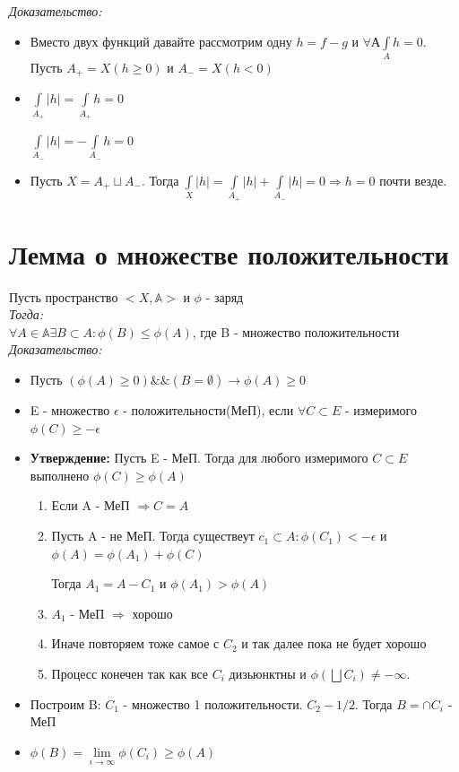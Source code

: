 \documentclass[paper=a4, fontsize=17pt]{article}
\begin{document}
	\emph{Доказательство: }

		\begin{itemize}
			\item
			Вместо двух функций давайте рассмотрим одну $h = f - g$ и $\forall А \int\limits_A h = 0$. Пусть $A_{+} = X(h\geq 0)$ и $A_- = X(h < 0)$
			\item
			$\int\limits_{A_+} |h| = \int\limits_{A_+} h = 0$ \par
			$\int\limits_{A_-} |h| = -\int\limits_{A_-} h = 0$
			\item
			Пусть $X = A_+ \sqcup A_-$. Тогда $\int\limits_X |h| = \int\limits_{A_+} |h| + \int\limits_{A_-} |h| = 0 \Rightarrow h = 0$ почти везде.
		\end{itemize}
\section{Лемма о множестве положительности}
	Пусть пространство $<X, \mathbb{A}>$ и $\phi$ - заряд\\
	\emph{Тогда: }\\
		$\forall A\in \mathbb{A} \exists B \subset A : \phi(B) \leq \phi(A)$, где B - множество положительности \\
	\emph{Доказательство: } \\

		\begin{itemize}
			\item Пусть $(\phi(A) \geq 0) \&\& (B = \emptyset) \rightarrow \phi(A) \geq 0$
			\item E - множество $\epsilon$ - положительности(МеП), если  $\forall C \subset E$ - измеримого $ \phi(C) \geq -\epsilon$
			\item \textbf{Утверждение: }Пусть E - МеП. Тогда для любого измеримого $C \subset E$ выполнено $\phi(C) \geq \phi(A)$
			\begin{enumerate}
				\item Если A - МеП $\Rightarrow C = A$
				\item Пусть A - не МеП. Тогда существеут $c_1 \subset A : \phi(C_1) < -\epsilon$ и $\phi(A) = \phi(A_1) + \phi(C)$

				Тогда $A_1 = A - C_1$ и $\phi(A_1) > \phi(A)$
				\item $A_1$ - МеП $\Rightarrow$ хорошо
				\item Иначе повторяем тоже самое с $C_2$ и так далее пока не будет хорошо
				\item Процесс конечен так как все $C_i$ дизьюнктны и $\phi(\bigsqcup C_i) \neq -\infty.$
			\end{enumerate}
			\item Построим B: $C_1$ - множество 1 положительности. $C_2 - 1/2$. Тогда $B = \cap C_i$ - МеП
			\item $\phi(B) = \lim\limits_{i \rightarrow \infty} \phi(C_i) \geq \phi(A)$
		\end{itemize}
\end{document}
